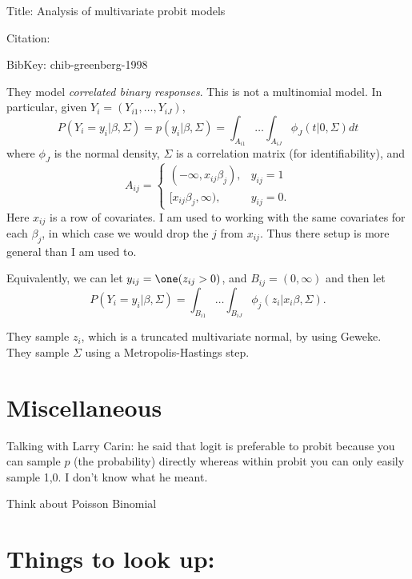 \documentclass{article}
\begin{document}
Title: Analysis of multivariate probit models

Citation: \cite{chib-greenberg-1998}

BibKey: chib-greenberg-1998

They model \emph{correlated binary responses}.  This is not a multinomial
model.  In particular, given $Y_i = (Y_{i1}, \ldots, Y_{iJ})$,
\[
P(Y_i = y_i | \beta, \Sigma) = p(y_i | \beta, \Sigma) = 
\int_{A_{i1}} \ldots \int_{A_{iJ}} \phi_J(t | 0, \Sigma) dt
\]
where $\phi_J$ is the normal density, $\Sigma$ is a correlation matrix (for
identifiability), and
\[
A_{ij} = 
\begin{cases}
(-\infty, x_{ij} \beta_j), & y_{ij} = 1 \\
[x_{ij} \beta_j, \infty), & y_{ij} = 0.
\end{cases}
\]
Here $x_{ij}$ is a row of covariates.  I am used to working with the same
covariates for each $\beta_j$, in which case we would drop the $j$ from
$x_{ij}$.  Thus there setup is more general than I am used to.

Equivalently, we can let $y_{ij} = \one (z_{ij} > 0)$, and $B_{ij} = (0,
\infty)$ and then let
\[
P(Y_i = y_i | \beta, \Sigma) = \int_{B_{i1}} \ldots \int_{B_{iJ}} \phi_j(z_i |
x_i \beta, \Sigma).
\]

They sample $z_i$, which is a truncated multivariate normal, by using Geweke.
They sample $\Sigma$ using a Metropolis-Hastings step.

\section{Miscellaneous}

\begin{outline}

\1 Talking with Larry Carin: he said that logit is preferable to probit because
you can sample $p$ (the probability) directly whereas within probit you can only
easily sample 1,0.  I don't know what he meant.

\1 Think about Poisson Binomial

\end{outline}

\section{Things to look up:}
\end{document}
